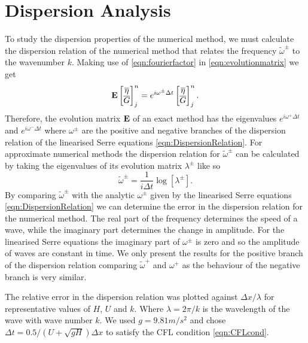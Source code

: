 \section{Dispersion Analysis}
To study the dispersion properties of the numerical method, we must calculate the dispersion relation of the numerical method  that relates the frequency $\widetilde{\omega}^\pm$ to the wavenumber $k$. Making use of \eqref{eqn:fourierfactor} in \eqref{eqn:evolutionmatrix} we get
\begin{equation}\mathbf{E}\begin{bmatrix}
\overline{\eta} \\ \overline{G}
\end{bmatrix}^{n}_j = 
e^{i \omega^\pm \Delta t}\begin{bmatrix}
\overline{\eta} \\ \overline{G}
\end{bmatrix}^{n}_j.
\label{eqn:dispanalomeganum1}
\end{equation}
Therefore, the evolution matrix $\mathbf{E}$ of an exact method has the eigenvalues $e^{i \omega^+ \Delta t}$ and $e^{i \omega^- \Delta t}$ where $\omega^\pm$ are the positive and negative branches of the dispersion relation of the linearised Serre equations \eqref{eqn:DispersionRelation}. For approximate numerical methods the dispersion relation for $\widetilde{\omega}^\pm$ can be calculated by taking the eigenvalues of its evolution matrix $\lambda^\pm$ like so
\begin{equation*}
\widetilde{\omega}^\pm = \frac{1}{i \Delta t} \log\left[ \lambda^\pm\right].
\end{equation*}
By comparing $\widetilde{\omega}^\pm$ with the analytic $\omega^\pm$ given by the linearised Serre equations \eqref{eqn:DispersionRelation} we can determine the error in the dispersion relation for the numerical method. The real part of the frequency determines the speed of a wave, while the imaginary part determines the change in amplitude. For the linearised Serre equations the imaginary part of $\omega^\pm$ is zero and so the amplitude of waves are constant in time. We only present the results for the positive branch of the dispersion relation comparing $\widetilde{\omega}^+$ and $\omega^+$ as the behaviour of the negative branch is very similar. 

The relative error in the dispersion relation was plotted against $\Delta x / \lambda$ for representative values of $H$, $U$ and $k$. Where $\lambda = 2 \pi / k$ is the wavelength of the wave with wave number $k$. We used $g = 9.81m/s^2$ and chose $\Delta t = 0.5 / \left(U + \sqrt{gH}\right) \Delta x$ to satisfy the CFL condition \eqref{eqn:CFLcond}.

